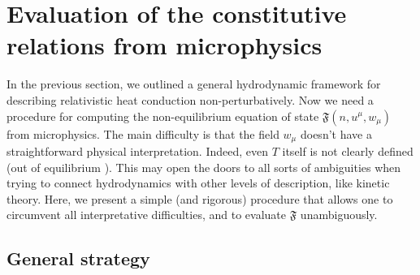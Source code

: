\documentclass[a4paper, amsfonts, amssymb, amsmath, reprint, showkeys, nofootinbib, twoside, onecolumn, notitlepage]{revtex4-1}
\newcommand{\F}{{\mathfrak{F}}}
\begin{document}
% 

\section{Evaluation of the constitutive relations from microphysics}

In the previous section, we outlined a general hydrodynamic framework for describing relativistic heat conduction non-perturbatively. Now we need a procedure for computing the non-equilibrium equation of state $\F(n,u^\mu,w_\mu)$ from microphysics. The main difficulty is that the field $w_\mu$ doesn't have a straightforward physical interpretation. Indeed, even $T$ itself is not clearly defined (out of equilibrium \cite{Kovtun2019}). This may open the doors to all sorts of ambiguities when trying to connect hydrodynamics with other levels of description, like kinetic theory. Here, we present a simple (and rigorous) procedure that allows one to circumvent all interpretative difficulties, and to evaluate $\F$ unambiguously.

\subsection{General strategy}\label{genna}
\end{document}
